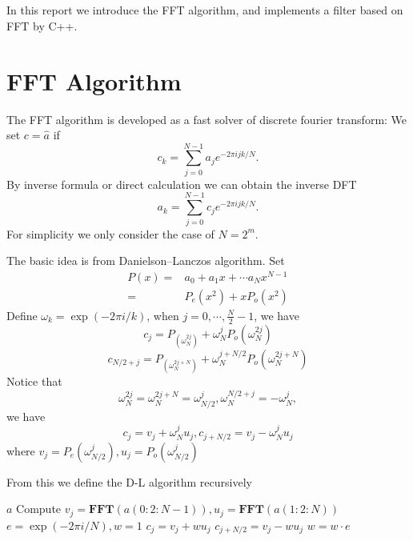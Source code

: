 \documentclass{article}
\DeclareMathOperator{\size}{size}
\begin{document}
	\maketitle
	\thispagestyle{fancy}
	\tableofcontents
	
	\section*{}

In this report we introduce the FFT algorithm, and implements a filter based on FFT by C++. 

\section{FFT Algorithm}
The FFT algorithm is developed as a fast solver of discrete fourier transform:
We set $c = \hat a$ if 
$$c_k = \sum_{j=0}^{N-1} a_j e^{-2\pi ijk/N}.$$
By inverse formula or direct calculation we can obtain the inverse DFT
$$a_k = \sum_{j=0}^{N-1} c_j e^{-2\pi ijk/N}.$$
For simplicity we only consider the case of $N = 2^m$. 

The basic idea is from Danielson--Lanczos algorithm. 
Set 
\begin{equation}
\begin{split}
P(x) =& a_0 + a_1x + \cdots a_Nx^{N-1} \\ 
 =& P_e(x^2) + xP_o(x^2)
\end{split}
\end{equation}
Define $\omega_k = \exp(-2\pi i/k)$, when $j=0,\cdots, \frac N2-1$, we have 
$$c_j = P_(\omega_N^{2j}) + \omega_N^jP_o(\omega_N^{2j})$$
$$c_{N/2+j} = P_(\omega_N^{2j+N}) + \omega_N^{j+N/2}P_o(\omega_N^{2j+N})$$
Notice that 
$$\omega_N^{2j} =\omega_N^{2j+N} =  \omega_{N/2}^j, \omega_N^{N/2 + j} = -\omega_{N}^j, $$
we have 
$$c_j = v_j + \omega_N^ju_j, c_{j+N/2} = v_j - \omega_N^j u_j$$
where $v_j = P_e(\omega_{N/2}^j), u_j = P_o(\omega_{N/2}^j)$

From this we define the D-L algorithm recursively
\begin{algorithm}[H]
	\caption{$c = \textbf{FFT}(a)$)}
	\begin{algorithmic}[1]
		\IF{$N:=\size(a)==1$}
		\STATE \Return $a$
		\ENDIF
		\STATE Compute $v_j = \textbf{FFT}(a(0:2:N-1)), u_j = \textbf{FFT}(a(1:2:N))$
		\STATE $e = \exp(-2\pi i/N), w = 1$
		\STATE $c_j = v_j + wu_j$
		\STATE $c_{j+N/2} = v_j - wu_j$
		\STATE $w = w\cdot e$
		\ENDFOR
	\end{algorithmic}
\end{algorithm}
\end{document}
